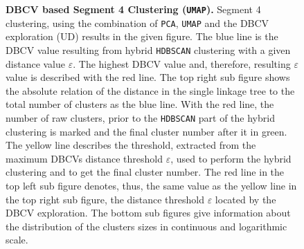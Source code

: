 \begin{figure}[!hbt]
\begin{subfigure}[b]{0.475\textwidth}
    \end{subfigure}
    \caption[\Acrshort{DBCV} based Segment 4 Clustering (\texttt{UMAP})]{\textbf{\Acrshort{DBCV} based Segment 4 Clustering (\texttt{UMAP}).} Segment 4 clustering, using the combination of \texttt{PCA}, \texttt{UMAP} and the \gls{DBCV} exploration (UD) results in the given figure. The blue line is the \gls{DBCV} value resulting from hybrid \texttt{HDBSCAN} clustering with a given distance value $\varepsilon$. The highest \gls{DBCV} value and, therefore, resulting $\varepsilon$ value is described with the red line. The top right sub figure shows the absolute relation of the distance in the single linkage tree to the total number of clusters as the blue line. With the red line, the number of raw clusters, prior to the \texttt{HDBSCAN} part of the hybrid clustering is marked and the final cluster number after it in green. The yellow line describes the threshold, extracted from the maximum \glspl{DBCV} distance threshold $\varepsilon$, used to perform the hybrid clustering and to get the final cluster number. The red line in the top left sub figure denotes, thus, the same value as the yellow line in the top right sub figure, the distance threshold $\varepsilon$ located by the \gls{DBCV} exploration. The bottom sub figures give information about the distribution of the clusters sizes in continuous and logarithmic scale.}
    \label{fig:UMAP_Cluster_DBCV_4}
\end{figure}

